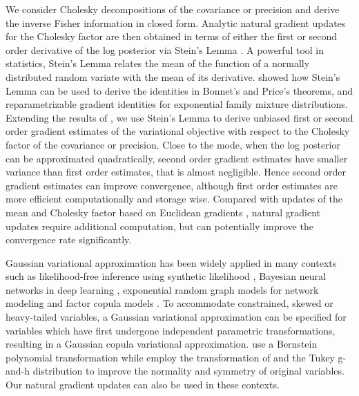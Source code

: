 \documentclass{statsoc}
\begin{document}
We consider Cholesky decompositions of the covariance or precision and derive the inverse Fisher information in closed form. Analytic natural gradient updates for the Cholesky factor are then obtained in terms of either the first or second order derivative of the log posterior via Stein's Lemma \citep{Stein1981}.  A powerful tool in statistics, Stein's Lemma relates the mean of the function of a normally distributed random variate with the mean of its derivative. \cite{Lin2019a} showed how Stein's Lemma can be used to derive the identities in Bonnet's and Price's theorems, and reparametrizable gradient identities for exponential family mixture distributions. Extending the results of \cite{Lin2019a}, we use Stein's Lemma to derive unbiased  first or second order gradient estimates of the variational objective with respect to the Cholesky factor of the covariance or precision. Close to the mode, when the log posterior can be approximated quadratically, second order gradient estimates have smaller variance than first order estimates, that is almost negligible. Hence second order gradient estimates can improve convergence, although first order estimates are more efficient computationally and storage wise. Compared with updates of the mean and Cholesky factor based on Euclidean gradients \citep{Titsias2014}, natural gradient updates require additional computation, but can potentially improve the convergence rate significantly. 

Gaussian variational approximation has been widely applied in many contexts such as likelihood-free inference using synthetic likelihood \citep{Ong2018a}, Bayesian neural networks in deep learning \citep{Khan2018}, exponential random graph models for network modeling \citep{Tan2020a} and factor copula models \citep{Nguyen2020}. To accommodate constrained, skewed or heavy-tailed variables, a Gaussian variational approximation can be specified for variables which have first undergone independent parametric transformations, resulting in a Gaussian copula variational approximation. \cite{Han2016} use a Bernstein polynomial transformation while \cite{Smith2020} employ the transformation of \cite{Yeo2000} and the Tukey g-and-h distribution \citep{Yan2019} to improve the normality and symmetry of original variables. Our natural gradient updates can also be used in these contexts. 
\end{document}
